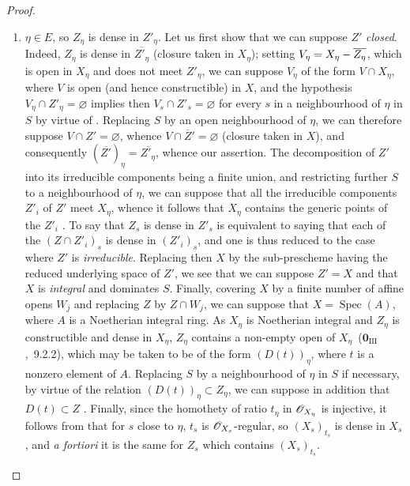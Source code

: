 \begin{proof}
\begin{enumerate}[label=\upshape{$\arabic{enumi}^\circ$}]
  \item\label{IV.9.5.3.case2} $\eta\in E$, so $Z_\eta$ is dense in $Z'_\eta$.
  Let us first show that we can suppose $Z'$ \emph{closed}.
  Indeed, $Z_\eta$ is dense in $\overline{Z'_\eta}$ (closure taken in $X_\eta$); setting $V_\eta=X_\eta-\overline{Z_\eta}$, which is open in $X_\eta$ and does not meet $Z'_\eta$, we can suppose $V_\eta$ of the form $V\cap X_\eta$, where $V$ is open (and hence constructible) in $X$, and the hypothesis $V_\eta\cap Z'_\eta=\varnothing$ implies then $V_s\cap Z'_s=\varnothing$ for every $s$ in a neighbourhood of $\eta$ in $S$ by virtue of .
  Replacing $S$ by an open neighbourhood of $\eta$, we can therefore suppose $V\cap Z'=\varnothing$, whence $V\cap\overline Z'=\varnothing$ (closure taken in $X$), and consequently $(\overline{Z'})_\eta=\overline{Z'_\eta}$, whence our assertion.
  The decomposition of $Z'$ into its irreducible components being a finite union, and restricting further $S$ to a neighbourhood of $\eta$, we can suppose that all the irreducible components $Z'_i$ of $Z'$ meet $X_\eta$, whence it follows that $X_\eta$ contains the generic points of the $Z'_i$ .
  To say that $Z_s$ is dense in $Z'_s$ is equivalent to saying that each of the $(Z\cap Z'_i)_s$ is dense in $(Z'_i)_s$, and one is thus reduced to the case where $Z'$ is \emph{irreducible}.
  Replacing then $X$ by the sub-prescheme having the reduced underlying space of $Z'$, we see that we can suppose $Z'=X$ and that $X$ is \emph{integral} and dominates $S$.
  Finally, covering $X$ by a finite number of affine opens $W_j$ and replacing $Z$ by $Z\cap W_j$, we can suppose that $X=\operatorname{Spec}(A)$, where $A$ is a Noetherian integral ring.
  As $X_\eta$ is Noetherian integral and $Z_\eta$ is constructible and dense in $X_\eta$, $Z_\eta$ contains a non-empty open of $X_\eta$~($\mathbf{0}_{\mathrm{III}}$,~9.2.2), which may be taken to be of the form $(D(t))_\eta$, where $t$ is a nonzero element of $A$.
  Replacing $S$ by a neighbourhood of $\eta$ in $S$ if necessary, by virtue of the relation $(D(t))_\eta\subset Z_\eta$, we can suppose in addition that $D(t)\subset Z$ .
  Finally, since the homothety of ratio $t_\eta$ in $\mathscr{O}_{X_\eta}$ is injective, it follows from  that for $s$ close to $\eta$, $t_s$ is $\mathscr{O}_{X_s}$-regular, so $(X_s)_{t_s}$ is dense in $X_s$, and \emph{a fortiori} it is the same for $Z_s$ which contains $(X_s)_{t_s}$.
\end{enumerate}
\end{proof}

